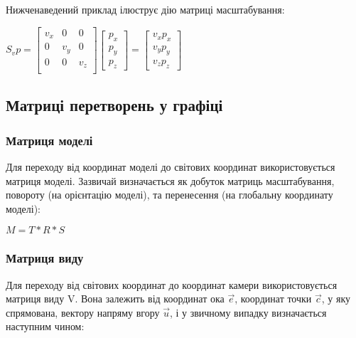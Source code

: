 Нижченаведений приклад ілюструє дію матриці масштабування:

\begin{center}
  $S_vp =
  \begin{bmatrix}
    v_x & 0 & 0  \\
    0 & v_y & 0  \\
    0 & 0 & v_z  \\
  \end{bmatrix}
  \begin{bmatrix}
    p_x \\ p_y \\ p_z
  \end{bmatrix}
  =
  \begin{bmatrix}
    v_xp_x \\ v_yp_y \\ v_zp_z
  \end{bmatrix}$
\end{center}

\subsection{Матриці перетворень у графіці}

\subsubsection{Матриця моделі}

Для переходу від координат моделі до світових координат використовується матриця моделі. Зазвичай визначається як добуток матриць масштабування, повороту (на орієнтацію моделі), та перенесення (на глобальну координату моделі):

\begin{center}
  $M = T * R * S$
\end{center}

\subsubsection{Матриця виду}

Для переходу від світових координат до координат камери використовується матриця виду V. Вона залежить від координат ока $\vec e$, координат точки $\vec c$, у яку спрямована, вектору напряму вгору $\vec u$, і у звичному випадку визначається наступним чином:

